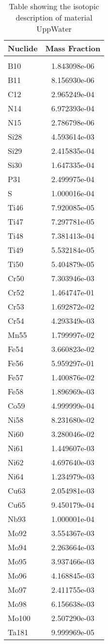 \begin{centering}
\begin{table}[ht!]
\begin{tabular}{l | c}
\hline
Nuclide & Mass Fraction\\
\hline
\\
B10 & 1.843098e-06\\
B11 & 8.156930e-06\\
C12 & 2.965249e-04\\
N14 & 6.972393e-04\\
N15 & 2.786798e-06\\
Si28 & 4.593614e-03\\
Si29 & 2.415835e-04\\
Si30 & 1.647335e-04\\
P31 & 2.499975e-04\\
S & 1.000016e-04\\
Ti46 & 7.920085e-05\\
Ti47 & 7.297781e-05\\
Ti48 & 7.381413e-04\\
Ti49 & 5.532184e-05\\
Ti50 & 5.404879e-05\\
Cr50 & 7.303946e-03\\
Cr52 & 1.464747e-01\\
Cr53 & 1.692872e-02\\
Cr54 & 4.293349e-03\\
Mn55 & 1.799997e-02\\
Fe54 & 3.660823e-02\\
Fe56 & 5.959297e-01\\
Fe57 & 1.400876e-02\\
Fe58 & 1.896969e-03\\
Co59 & 4.999999e-04\\
Ni58 & 8.231680e-02\\
Ni60 & 3.280046e-02\\
Ni61 & 1.449607e-03\\
Ni62 & 4.697640e-03\\
Ni64 & 1.234979e-03\\
Cu63 & 2.054981e-03\\
Cu65 & 9.450179e-04\\
Nb93 & 1.000001e-04\\
Mo92 & 3.554367e-03\\
Mo94 & 2.263664e-03\\
Mo95 & 3.937466e-03\\
Mo96 & 4.168845e-03\\
Mo97 & 2.411755e-03\\
Mo98 & 6.156638e-03\\
Mo100 & 2.507290e-03\\
Ta181 & 9.999969e-05
\end{tabular}
\caption{Table showing the isotopic description of material UppWater}
\label{table:material_UppWater}
\end{table}\clearpage


\end{centering}
